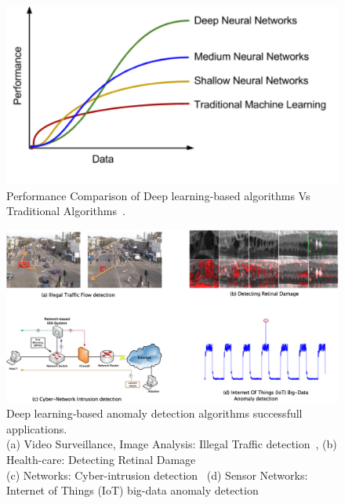 \begin{figure}[h]
\centering
\includegraphics[scale=0.5]{images/traditionalVsDeepLearning}
\captionsetup{justification=centering}
\caption{Performance Comparison of Deep learning-based algorithms Vs Traditional Algorithms~\cite{deeplearningVstraditionalAlgorithms}.}
\label{fig:performanceCompare}
\end{figure}


\begin{figure}[h]
\includegraphics[scale=0.5]{images/applications}
\captionsetup{justification=centering}
\caption{Deep learning-based anomaly detection algorithms successfull applications.\\
(a) Video Surveillance, Image Analysis: Illegal Traffic detection~\cite{xie2017real},  (b) Health-care: Detecting Retinal Damage~\cite{schlegl2017unsupervised}\\
(c) Networks: Cyber-intrusion detection~\cite{javaid2016deep}  (d) Sensor Networks: Internet of Things (IoT) big-data anomaly detection~\cite{mohammadi2017deep} }
\label{fig:applications}
\end{figure}



